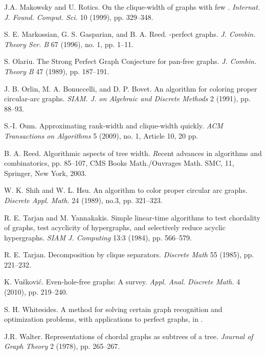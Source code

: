 \documentclass[11pt,a4paper]{article}
\begin{document}
\begin{thebibliography}{99}
J.A. Makowsky and U. Rotics. On the clique-width of graphs with
few . {\it Internat. J. Found. Comput. Sci.} 10 (1999), pp.
329--348.

S. E. Markossian, G. S. Gasparian, and B. A. Reed. -perfect
graphs. {\it J. Combin. Theory Ser. B} 67 (1996), no. 1, pp.
1--11.

S. Olariu. The Strong Perfect Graph Conjecture for pan-free
graphs. {\it J. Combin. Theory B} 47 (1989), pp. 187--191.

J. B. Orlin, M. A. Bonuccelli, and D. P. Bovet. An 
algorithm for coloring proper circular-arc graphs. {\sl SIAM. J.
on Algebraic and Discrete Methods} 2 (1991), pp. 88--93.

S.-I. Oum. Approximating rank-width and clique-width quickly. {\it
ACM Transactions on Algorithms} 5 (2009), no. 1, Article 10, 20 pp.

B. A. Reed. Algorithmic aspects of tree width. {\textit Recent advances in algorithms and combinatorics},
pp. 85--107, CMS Books Math./Ouvrages Math. SMC, 11, Springer, New York, 2003.

W. K. Shih and W. L. Hsu. An  algorithm to color proper circular arc graphs.
{\it Discrete Appl. Math.} 24 (1989), no.3, pp. 321--323.

R. E. Tarjan and M. Yannakakis. Simple linear-time algorithms to
test chordality of graphs,  test acyclicity of hypergraphs, and
selectively reduce acyclic hypergraphs.
 {\it SIAM J. Computing}
13:3 (1984), pp. 566--579.

R. E. Tarjan.
Decomposition by clique separators.
{\it Discrete Math}
55 (1985), pp. 221--232.

K. Vu\v{s}kovi\'c.
Even-hole-free graphs: A survey.
{\sl Appl. Anal. Discrete Math.}
4 (2010), pp. 219--240.

S. H. Whitesides. A method for solving certain graph recognition
and  optimization problems, with applications to perfect graphs,
in \cite{BerChv1984}.


J.R. Walter. Representations of chordal graphs as subtrees of a
tree. {\it Journal of Graph Theory} 2 (1978), pp. 265--267.

\end{thebibliography}
\end{document}
